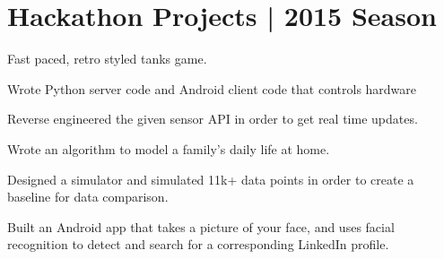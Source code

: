 \documentclass[]{deedy-resume-openfont}
\begin{document}
\begin{minipage}[t]{0.66\textwidth} 


\section{Hackathon Projects | 2015 Season}
\vspace{\topsep}
\begin{tightemize}
\item Fast paced, retro styled tanks game.
\end{tightemize}
\sectionsep

\begin{tightemize}
\item Wrote Python server code and Android client code that controls hardware
\item Reverse engineered the given sensor API in order to get real time updates. 
\end{tightemize}
\sectionsep

\begin{tightemize}
\item Wrote an algorithm to model a family's daily life at home.
\item Designed a simulator and simulated 11k+ data points in order to create a baseline for data comparison. 
\end{tightemize}
\sectionsep

\begin{tightemize}
\item Built an Android app that takes a picture of your face, and uses facial recognition to detect and search for a corresponding LinkedIn profile. 
\end{tightemize}
\sectionsep




\end{minipage}
\end{document}
